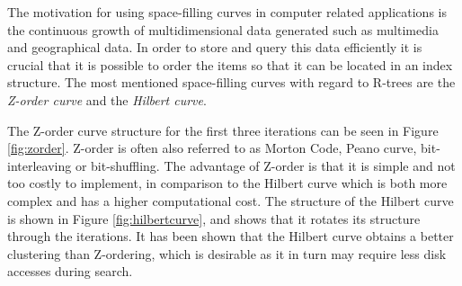 \noindent
The motivation for using space-filling curves in computer related applications is the continuous growth of multidimensional data generated such as multimedia and geographical data. In order to store and query this data efficiently it is crucial that it is possible to order the items so that it can be located in an index structure. The most mentioned space-filling curves with regard to R-trees are the \emph{Z-order curve} and the \emph{Hilbert curve}. \newline

\noindent
The Z-order curve structure for the first three iterations can be seen in Figure \ref{fig:zorder}. Z-order is often also referred to as Morton Code, Peano curve, bit-interleaving or bit-shuffling\cite{performanceSFC}\cite{fractKeyRetri}. The advantage of Z-order is that it is simple and not too costly to implement, in comparison to the Hilbert curve which is both more complex and has a higher computational cost. The structure of the Hilbert curve is shown in Figure \ref{fig:hilbertcurve}, and shows that it rotates its structure through the iterations. It has been shown that the Hilbert curve obtains a better clustering than Z-ordering\cite{AnalysisHilbert}\cite{fractKeyRetri}, which is desirable as it in turn may require less disk accesses during search. 

